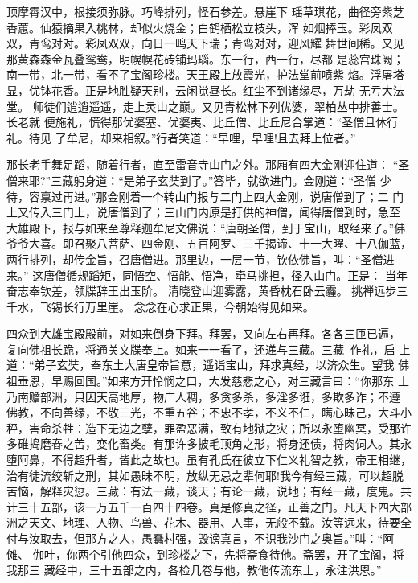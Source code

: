 顶摩霄汉中，根接须弥脉。巧峰排列，怪石参差。悬崖下
瑶草琪花，曲径旁紫芝香蕙。仙猿摘果入桃林，却似火烧金；白鹤栖松立枝头，浑
如烟捧玉。彩凤双双，青鸾对对。彩凤双双，向日一鸣天下瑞；青鸾对对，迎风耀
舞世间稀。又见那黄森森金瓦叠鸳鸯，明幌幌花砖铺玛瑙。东一行，西一行，尽都
是蕊宫珠阙；南一带，北一带，看不了宝阁珍楼。天王殿上放霞光，护法堂前喷紫
焰。浮屠塔显，优钵花香。正是地胜疑天别，云闲觉昼长。红尘不到诸缘尽，万劫
无亏大法堂。
师徒们逍逍遥遥，走上灵山之巅。又见青松林下列优婆，翠柏丛中排善士。长老就
便施礼，慌得那优婆塞、优婆夷、比丘僧、比丘尼合掌道：“圣僧且休行礼。待见
了牟尼，却来相叙。”行者笑道：“早哩，早哩!且去拜上位者。”

那长老手舞足蹈，随着行者，直至雷音寺山门之外。那厢有四大金刚迎住道：
“圣僧来耶?”三藏躬身道：“是弟子玄奘到了。”答毕，就欲进门。金刚道：“圣僧
少待，容禀过再进。”那金刚着一个转山门报与二门上四大金刚，说唐僧到了；二
门上又传入三门上，说唐僧到了；三山门内原是打供的神僧，闻得唐僧到时，急至
大雄殿下，报与如来至尊释迦牟尼文佛说：“唐朝圣僧，到于宝山，取经来了。”佛
爷爷大喜。即召聚八菩萨、四金刚、五百阿罗、三千揭谛、十一大曜、十八伽蓝，
两行排列，却传金旨，召唐僧进。那里边，一层一节，钦依佛旨，叫：“圣僧进来。”
这唐僧循规蹈矩，同悟空、悟能、悟净，牵马挑担，径入山门。正是：
当年奋志奉钦差，领牒辞王出玉阶。
清晓登山迎雾露，黄昏枕石卧云霾。
挑禅远步三千水，飞锡长行万里崖。
念念在心求正果，今朝始得见如来。

四众到大雄宝殿殿前，对如来倒身下拜。拜罢，又向左右再拜。各各三匝已遍，
复向佛祖长跪，将通关文牒奉上。如来一一看了，还递与三藏。三藏作礼，启
上道：“弟子玄奘，奉东土大唐皇帝旨意，遥诣宝山，拜求真经，以济众生。望我
佛祖垂恩，早赐回国。”如来方开怜悯之口，大发慈悲之心，对三藏言曰：“你那东
土乃南赡部洲，只因天高地厚，物广人稠，多贪多杀，多淫多诳，多欺多诈；不遵
佛教，不向善缘，不敬三光，不重五谷；不忠不孝，不义不仁，瞒心昧己，大斗小
秤，害命杀牲：造下无边之孽，罪盈恶满，致有地狱之灾；所以永堕幽冥，受那许
多碓捣磨舂之苦，变化畜类。有那许多披毛顶角之形，将身还债，将肉饲人。其永
堕阿鼻，不得超升者，皆此之故也。虽有孔氏在彼立下仁义礼智之教，帝王相继，
治有徒流绞斩之刑，其如愚昧不明，放纵无忌之辈何耶!我今有经三藏，可以超脱
苦恼，解释灾愆。三藏：有法一藏，谈天；有论一藏，说地；有经一藏，度鬼。共
计三十五部，该一万五千一百四十四卷。真是修真之径，正善之门。凡天下四大部
洲之天文、地理、人物、鸟兽、花木、器用、人事，无般不载。汝等远来，待要全
付与汝取去，但那方之人，愚蠢村强，毁谤真言，不识我沙门之奥旨。”叫：“阿傩、
伽叶，你两个引他四众，到珍楼之下，先将斋食待他。斋罢，开了宝阁，将我那三
藏经中，三十五部之内，各检几卷与他，教他传流东土，永注洪恩。”

